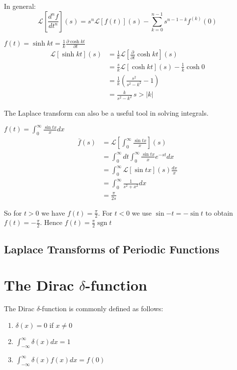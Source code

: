 \documentclass{physics_notes}
\newcommand{\zintfty}{\int_0^\infty}
\renewcommand{\L}[2]{\mathcal{L}\left[#1\right](#2)}
\DeclareMathOperator{\sgn}{sgn}
\begin{document}
In general:
\begin{equation*}
\L{\frac{d^n f}{dt^n}}{s} = s^n\L{f(t)}{s} - \sum_{k=0}^{n-1} s^{n-1-k}f^{(k)}(0)
\end{equation*}

\begin{example}{$f(t) = \sinh{kt} = \frac{1}{k}\frac{\partial \cosh{kt}}{\partial t}$}
\begin{align*}
\L{\sinh{kt}}{s} &= \frac{1}{k}\L{\frac{\partial}{\partial t}\cosh{kt}}{s} \\
&= \frac{s}{k}\L{\cosh{kt}}{s} - \frac{1}{k}\cosh{0} \\
&= \frac{1}{k}\left(\frac{s^2}{s^2 - k^2} - 1\right) \\
&= \frac{k}{s^2 - k^2} \, s>|k|
\end{align*}
\end{example}

The Laplace transform can also be a useful tool in solving integrals.

\begin{example}{$f(t) = \zintfty \frac{\sin{tx}}{x}dx$}
\begin{align*}
\bar{f}(s) &= \L{\zintfty \frac{\sin{tx}}{x}}{s} \\
&= \zintfty dt \zintfty\frac{\sin{tx}}{x}e^{-st} dx \\
&= \zintfty \L{\sin{tx}}{s}\frac{dx}{x} \\
&= \zintfty \frac{1}{s^2 + x^2} dx \\
&= \frac{\pi}{2s}
\end{align*}

So for $t>0$ we have $f(t) = \frac{\pi}{2}$. For $t<0$ we use $\sin{-t} = -\sin{t}$ to obtain $f(t) = -\frac{\pi}{2}$. Hence $f(t) = \frac{\pi}{2}\sgn{t}$
\end{example}


\subsection{Laplace Transforms of Periodic Functions}


\section{The Dirac $\delta$-function}\label{sec:dirac_delta}

The Dirac $\delta$-function is commonly defined as follows:

\begin{enumerate}
	\item $\delta(x) = 0$ if $x\neq 0$
	\item $\int_{-\infty}^\infty \delta(x) dx = 1$
	\item $\int_{-\infty}^\infty \delta(x) f(x) dx = f(0)$
\end{enumerate}
\end{document}
